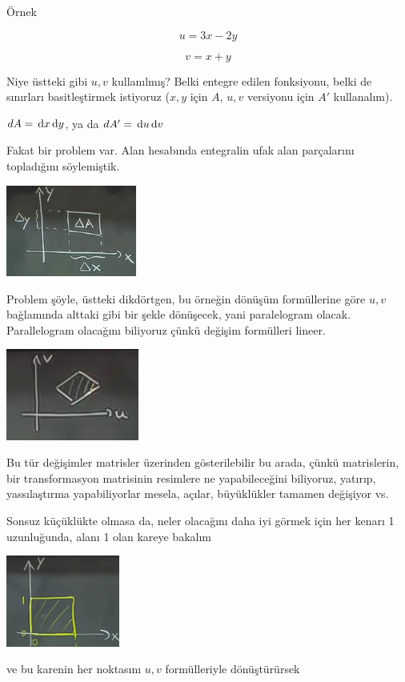 \documentclass[12pt,fleqn]{article}\usepackage{../../common}
\begin{document}
Örnek 

$$ u = 3x - 2y $$

$$ v = x + y $$

Niye üstteki gibi $u,v$ kullanılmış? Belki entegre edilen fonksiyonu, belki
de sınırları basitleştirmek istiyoruz ($x,y$ için $A$, $u,v$ versiyonu için
$A'$ kullanalım). 

$dA = \,\mathrm{d} x \,\mathrm{d} y$, ya da $dA' = \,\mathrm{d} u \,\mathrm{d} v$ 

Fakat bir problem var. Alan hesabında entegralin ufak alan parçalarını
topladığını söylemiştik. 

\includegraphics[height=3cm]{18_2.png}

Problem şöyle, üstteki dikdörtgen, bu örneğin dönüşüm formüllerine göre $u,v$
bağlamında alttaki gibi bir şekle dönüşecek, yani paralelogram
olacak. Parallelogram olacağını biliyoruz çünkü değişim formülleri lineer.

\includegraphics[height=3cm]{18_3.png}

Bu tür değişimler matrisler üzerinden gösterilebilir bu arada, çünkü
matrislerin, bir transformasyon matrisinin resimlere ne yapabileceğini
biliyoruz, yatırıp, yassılaştırma yapabiliyorlar mesela, açılar,
büyüklükler tamamen değişiyor vs. 

Sonsuz küçüklükte olmasa da, neler olacağını daha iyi görmek için her
kenarı 1 uzunluğunda, alanı 1 olan kareye bakalım

\includegraphics[height=3cm]{18_4.png}

ve bu karenin her noktasını $u,v$ formülleriyle dönüştürürsek
\end{document}
